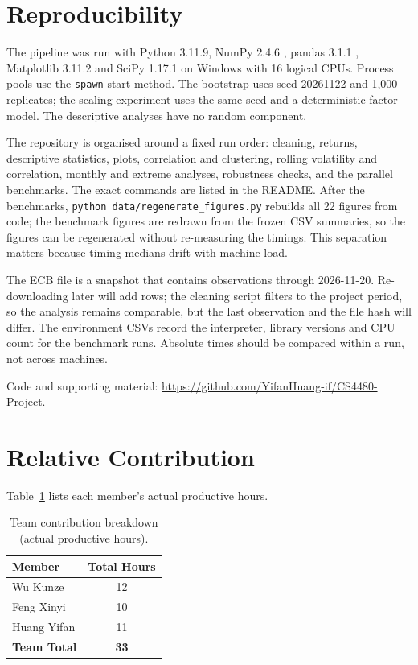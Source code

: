 \documentclass[journal]{IEEEtran}
\begin{document}
\section{Reproducibility}
\label{sec:reproducibility}

The pipeline was run with Python 3.11.9, NumPy 2.4.6 \cite{harris2020}, pandas 3.1.1 \cite{mckinney2010}, Matplotlib 3.11.2 \cite{hunter2007} and SciPy 1.17.1 \cite{virtanen2020} on Windows with 16 logical CPUs. Process pools use the \texttt{spawn} start method. The bootstrap uses seed 20261122 and 1,000 replicates; the scaling experiment uses the same seed and a deterministic factor model. The descriptive analyses have no random component.

The repository is organised around a fixed run order: cleaning, returns, descriptive statistics, plots, correlation and clustering, rolling volatility and correlation, monthly and extreme analyses, robustness checks, and the parallel benchmarks. The exact commands are listed in the README. After the benchmarks, \texttt{python data/regenerate\_figures.py} rebuilds all 22 figures from code; the benchmark figures are redrawn from the frozen CSV summaries, so the figures can be regenerated without re-measuring the timings. This separation matters because timing medians drift with machine load.

The ECB file is a snapshot that contains observations through 2026-11-20. Re-downloading later will add rows; the cleaning script filters to the project period, so the analysis remains comparable, but the last observation and the file hash will differ. The environment CSVs record the interpreter, library versions and CPU count for the benchmark runs. Absolute times should be compared within a run, not across machines.

Code and supporting material: \url{https://github.com/YifanHuang-if/CS4480-Project}.

\section{Relative Contribution}
\label{sec:contribution}

Table~\ref{tab:contributions} lists each member's actual productive hours.

\begin{table}[t]
\caption{Team contribution breakdown (actual productive hours).}
\label{tab:contributions}
\centering
\small
\renewcommand{\arraystretch}{1.25}
\begin{tabular}{l|c}
\hline
\textbf{Member} & \textbf{Total Hours} \\
\hline
Wu Kunze & 12 \\
\hline
Feng Xinyi & 10 \\
\hline
Huang Yifan & 11 \\
\hline
\textbf{Team Total} & \textbf{33} \\
\hline
\end{tabular}
\end{table}
\end{document}
